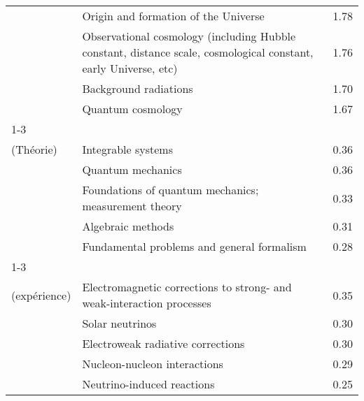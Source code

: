 \begin{longtable}[H]{p{}|p{}|p{}}
                                                                               & Origin and formation of the Universe &  1.78 \\
                                                                               & Observational cosmology (including Hubble constant, distance scale, cosmological constant, early Universe, etc) &  1.76 \\
                                                                               & Background radiations &  1.70 \\
                                                                               & Quantum cosmology &  1.67 \\
\cline{1-3}
\multirow{5}{*}{\begin{tabular}{l}Jargon\\ (Théorie)\end{tabular}} & Integrable systems &  0.36 \\
                                                                               & Quantum mechanics &  0.36 \\
                                                                               & Foundations of quantum mechanics; measurement theory &  0.33 \\
                                                                               & Algebraic methods &  0.31 \\
                                                                               & Fundamental problems and general formalism &  0.28 \\
\cline{1-3}
\multirow{5}{*}{\begin{tabular}{l}Jargon\\ (expérience)\end{tabular}} & Electromagnetic corrections to strong- and weak-interaction processes &  0.35 \\
                                                                               & Solar neutrinos &  0.30 \\
                                                                               & Electroweak radiative corrections &  0.30 \\
                                                                               & Nucleon-nucleon interactions &  0.29 \\
                                                                               & Neutrino-induced reactions &  0.25 \\

\end{longtable}
